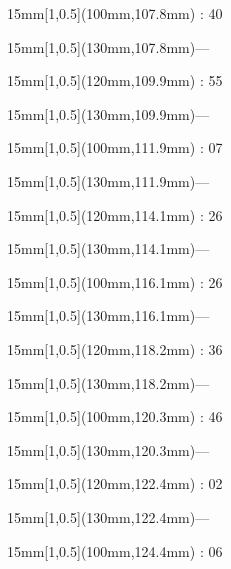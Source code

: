 \documentclass[a4paper]{memoir}
\begin{document}
\begin{textblock*}{15mm}[1,0.5](100mm,107.8mm) : 40\end{textblock*}
\begin{textblock*}{15mm}[1,0.5](130mm,107.8mm)\flushright —\end{textblock*}
\begin{textblock*}{15mm}[1,0.5](120mm,109.9mm) : 55\end{textblock*}
\begin{textblock*}{15mm}[1,0.5](130mm,109.9mm)\flushright —\end{textblock*}
\begin{textblock*}{15mm}[1,0.5](100mm,111.9mm) : 07\end{textblock*}
\begin{textblock*}{15mm}[1,0.5](130mm,111.9mm)\flushright —\end{textblock*}
\begin{textblock*}{15mm}[1,0.5](120mm,114.1mm) : 26\end{textblock*}
\begin{textblock*}{15mm}[1,0.5](130mm,114.1mm)\flushright —\end{textblock*}
\begin{textblock*}{15mm}[1,0.5](100mm,116.1mm) : 26\end{textblock*}
\begin{textblock*}{15mm}[1,0.5](130mm,116.1mm)\flushright —\end{textblock*}
\begin{textblock*}{15mm}[1,0.5](120mm,118.2mm) : 36\end{textblock*}
\begin{textblock*}{15mm}[1,0.5](130mm,118.2mm)\flushright —\end{textblock*}
\begin{textblock*}{15mm}[1,0.5](100mm,120.3mm) : 46\end{textblock*}
\begin{textblock*}{15mm}[1,0.5](130mm,120.3mm)\flushright —\end{textblock*}
\begin{textblock*}{15mm}[1,0.5](120mm,122.4mm) : 02\end{textblock*}
\begin{textblock*}{15mm}[1,0.5](130mm,122.4mm)\flushright —\end{textblock*}
\begin{textblock*}{15mm}[1,0.5](100mm,124.4mm) : 06\end{textblock*}
\end{document}
